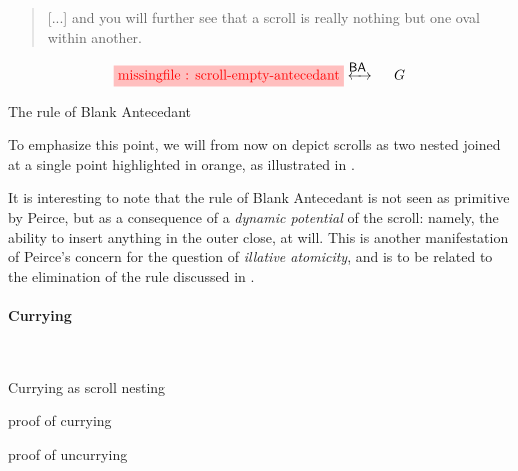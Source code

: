 \begin{quote}
  [...] and you will further see that a scroll is really nothing but one oval
within another.
\end{quote}

\begin{marginfigure}
  $$
  \!\!\!\!\stkfig{1}{scroll-empty-antecedant}
  \!\!\!\!\xinvstep{\rsf{BA}}~~~~
  G
  $$
  \caption{The rule of Blank Antecedant}
\end{marginfigure}

To emphasize this point, we will from now on depict scrolls as two nested 
joined at a single point highlighted in orange, as illustrated in
.

\begin{remark}
  It is interesting to note that the rule of Blank Antecedant is not seen as
  primitive by Peirce, but as a consequence of a \emph{dynamic potential} of the
  scroll: namely, the ability to insert anything in the outer close, at will.
  This is another manifestation of Peirce's concern for the question of
  \emph{illative atomicity}, and is to be related to the elimination of the
   rule discussed in .
\end{remark}

\paragraph{Currying}

\begin{marginfigure}[-10em]
  ~~~
  \caption{Currying as scroll nesting}
\end{marginfigure}

\begin{marginfigure}[0em]
  
  \caption{ proof of currying}
\end{marginfigure}

\begin{marginfigure}[27em]
  
  \caption{ proof of uncurrying}
\end{marginfigure}

